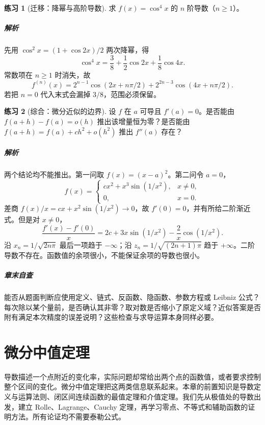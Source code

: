 \documentclass[UTF8,fontset=fandol,12pt,oneside,openany]{ctexrep}
\theoremstyle{definition}
\newtheorem{exercise}{练习}[chapter]
\begin{document}
\begin{exercise}[迁移：降幂与高阶导数]
求 $f(x)=\cos^4x$ 的 $n$ 阶导数（$n\ge1$）。
\end{exercise}
\paragraph{解析}先用 $\cos^2x=(1+\cos2x)/2$ 两次降幂，得
\[
 \cos^4x=\frac38+\frac12\cos2x+\frac18\cos4x.
\]
常数项在 $n\ge1$ 时消失，故
\[
 f^{(n)}(x)=2^{n-1}\cos(2x+n\pi/2)
            +2^{2n-3}\cos(4x+n\pi/2).
\]
若把 $n=0$ 代入末式会漏掉 $3/8$，范围必须保留。

\begin{exercise}[综合：微分近似的边界]
设 $f$ 在 $a$ 可导且 $f'(a)=0$。是否能由 $f(a+h)-f(a)=o(h)$ 推出该增量恒为零？是否能由 $f(a+h)=f(a)+ch^2+o(h^2)$ 推出 $f''(a)$ 存在？
\end{exercise}
\paragraph{解析}两个结论均不能推出。第一问取 $f(x)=(x-a)^2$。第二问令 $a=0$，
\[
 f(x)=\begin{cases}cx^2+x^3\sin(1/x^2),&x\ne0,\\0,&x=0.\end{cases}
\]
差商 $f(x)/x=cx+x^2\sin(1/x^2)\to0$，故 $f'(0)=0$，并有所给二阶渐近式。但是对 $x\ne0$，
\[
 \frac{f'(x)-f'(0)}x
 =2c+3x\sin(1/x^2)-\frac2x\cos(1/x^2).
\]
沿 $x_n=1/\sqrt{2n\pi}$ 最后一项趋于 $-\infty$；沿 $z_n=1/\sqrt{(2n+1)\pi}$ 趋于 $+\infty$。二阶导数不存在。函数值的余项很小，不能保证余项的导数也很小。

\paragraph{章末自查}能否从题面判断应使用定义、链式、反函数、隐函数、参数方程或 Leibniz 公式？每次除以某个量前，是否确认其非零？取对数是否缩小了原定义域？近似答案是否附有满足本次精度的误差说明？这些检查与求导运算本身同样必要。


\chapter{微分中值定理}
\label{lec:06:chapter}

导数描述一个点附近的变化率，实际问题却常给出两个点的函数值，或者要求控制整个区间的变化。微分中值定理把这两类信息联系起来。本章的前置知识是导数定义与运算法则、闭区间连续函数的最值定理和介值定理。我们先从极值处的导数出发，建立 Rolle、Lagrange、Cauchy 定理，再学习零点、不等式和辅助函数的证明方法。所有论证均不需要泰勒公式。
\end{document}
